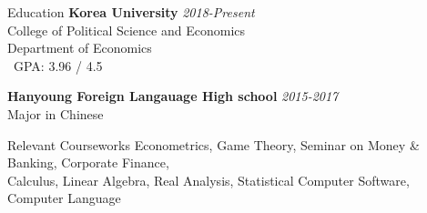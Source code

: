 \documentclass{resume} %
\begin{document}

\begin{rSection}{Education}
{\bf Korea University} \hfill {\em 2018-Present} \\ 
College of Political Science and Economics\\
Department of Economics\smallskip \\\
GPA: 3.96 / 4.5

{\bf Hanyoung Foreign Langauage High school} \hfill {\em 2015-2017}\\
Major in Chinese\smallskip
\end{rSection}
\begin{rSection}{Relevant Courseworks}
Econometrics, Game Theory, Seminar on Money \& Banking, Corporate Finance,\\ Calculus, Linear Algebra, Real Analysis, Statistical Computer Software, Computer Language
\end{rSection}

\end{document}
